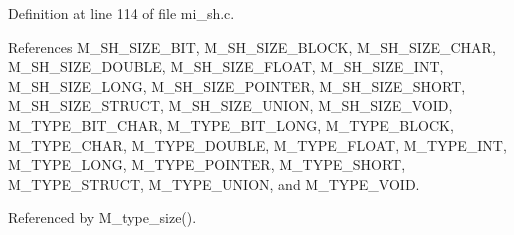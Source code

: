 Definition at line 114 of file mi\_\-sh.c.

References M\_\-SH\_\-SIZE\_\-BIT, M\_\-SH\_\-SIZE\_\-BLOCK, M\_\-SH\_\-SIZE\_\-CHAR, M\_\-SH\_\-SIZE\_\-DOUBLE, M\_\-SH\_\-SIZE\_\-FLOAT, M\_\-SH\_\-SIZE\_\-INT, M\_\-SH\_\-SIZE\_\-LONG, M\_\-SH\_\-SIZE\_\-POINTER, M\_\-SH\_\-SIZE\_\-SHORT, M\_\-SH\_\-SIZE\_\-STRUCT, M\_\-SH\_\-SIZE\_\-UNION, M\_\-SH\_\-SIZE\_\-VOID, M\_\-TYPE\_\-BIT\_\-CHAR, M\_\-TYPE\_\-BIT\_\-LONG, M\_\-TYPE\_\-BLOCK, M\_\-TYPE\_\-CHAR, M\_\-TYPE\_\-DOUBLE, M\_\-TYPE\_\-FLOAT, M\_\-TYPE\_\-INT, M\_\-TYPE\_\-LONG, M\_\-TYPE\_\-POINTER, M\_\-TYPE\_\-SHORT, M\_\-TYPE\_\-STRUCT, M\_\-TYPE\_\-UNION, and M\_\-TYPE\_\-VOID.

Referenced by M\_\-type\_\-size().